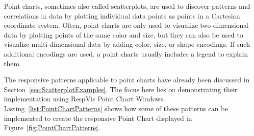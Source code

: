 Point charts, sometimes also called scatterplots, are used to discover
patterns and correlations in data by plotting individual data points
as points in a Cartesian coordinate system. Often, point charts are
only used to visualize two-dimensional data by plotting points of the
same color and size, but they can also be used to visualize
multi-dimensional data by adding color, size, or shape encodings. If
such additional encodings are used, a point charts usually includes a
legend to explain them.

The responsive patterns applicable to point charts have already been
discussed in Section~\ref{sec:ScatterplotExamples}. The focus here
lies on demonstrating their implementation using RespVis Point Chart
Windows. Listing~\ref{list:PointChartPatterns} shows how some of
these patterns can be implemented to create the responsive Point Chart
displayed in Figure~\ref{fig:PointChartPatterns}.


